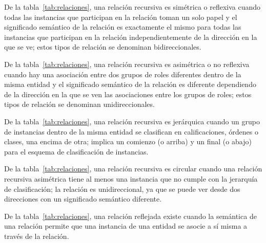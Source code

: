De la tabla~\ref{tab:relaciones}, una relación recursiva es simétrica o reflexiva cuando todas las instancias que participan en la relación toman un solo papel y el significado semántico de la relación es exactamente el mismo para todas las instancias que participan en la relación independientemente de la dirección en la que se ve; estos tipos de relación se denominan bidireccionales.


De la tabla~\ref{tab:relaciones}, una relación recursiva es asimétrica o no reflexiva cuando hay una asociación entre dos grupos de roles diferentes dentro de la misma entidad y el significado semántico de la relación es diferente dependiendo de la dirección en la que se ven las asociaciones entre los grupos de roles; estos tipos de relación se denominan unidireccionales.


De la tabla~\ref{tab:relaciones}, una relación recursiva es jerárquica cuando un grupo de instancias dentro de la misma entidad se clasifican en calificaciones, órdenes o clases, una encima de otra; implica un comienzo (o arriba) y un final (o abajo) para el esquema de clasificación de instancias.


De la tabla~\ref{tab:relaciones}, una relación recursiva es circular cuando una relación recursiva asimétrica tiene al menos una instancia que no cumple con la jerarquía de clasificación; la relación es unidireccional, ya que se puede ver desde dos direcciones con un significado semántico diferente.


De la tabla~\ref{tab:relaciones}, una relación reflejada existe cuando la semántica de una relación permite que una instancia de una entidad se asocie a sí misma a través de la relación.


